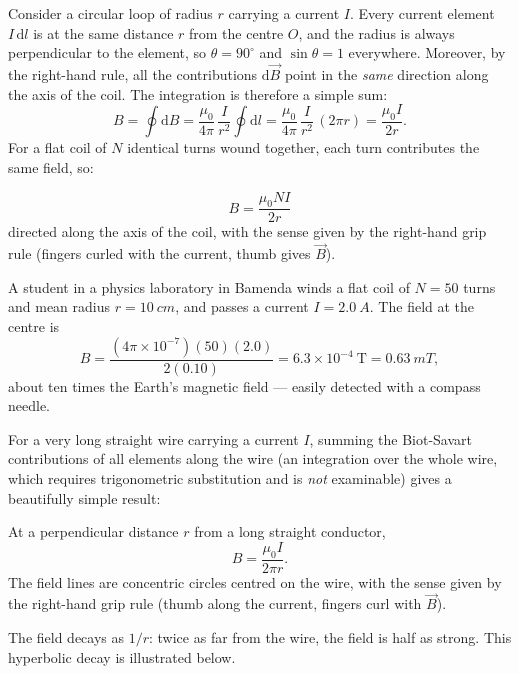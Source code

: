 \documentclass[11pt]{article}
\newcounter{popsec}
\newcounter{popsub}
\newcommand{\courssub}[1]{%
  \stepcounter{popsub}%
  \par\vspace{9pt}\noindent{\popxbold\fontsize{11.5}{13}\selectfont\color{popink}{\color{poporange}\thepopsec.\thepopsub}\hspace{6pt}#1}\par\nopagebreak\vspace{4pt}
}
\begin{document}
Consider a circular loop of radius $r$ carrying a current $I$. Every current element $I\,\mathrm{d}l$ is at the same distance $r$ from the centre $O$, and the radius is always perpendicular to the element, so $\theta = 90^{\circ}$ and $\sin\theta = 1$ everywhere. Moreover, by the right-hand rule, all the contributions $\mathrm{d}\vec{B}$ point in the \emph{same} direction along the axis of the coil. The integration is therefore a simple sum:
\[ B = \oint \mathrm{d}B = \frac{\mu_0}{4\pi}\,\frac{I}{r^{2}}\oint \mathrm{d}l = \frac{\mu_0}{4\pi}\,\frac{I}{r^{2}}\,(2\pi r) = \frac{\mu_0 I}{2r}. \]
For a flat coil of $N$ identical turns wound together, each turn contributes the same field, so:

\begin{propriete}
\[ B = \frac{\mu_0 N I}{2r} \]
directed along the axis of the coil, with the sense given by the right-hand grip rule (fingers curled with the current, thumb gives $\vec{B}$).
\end{propriete}

\begin{exemplebox}
A student in a physics laboratory in Bamenda winds a flat coil of $N = 50$ turns and mean radius $r = \SI{10}{cm}$, and passes a current $I = \SI{2.0}{A}$. The field at the centre is
\[ B = \frac{(4\pi\times 10^{-7})(50)(2.0)}{2(0.10)} = 6.3\times 10^{-4}\ \mathrm{T} = \SI{0.63}{mT}, \]
about ten times the Earth's magnetic field — easily detected with a compass needle.
\end{exemplebox}

\courssub{Field due to a Long Straight Wire}

For a very long straight wire carrying a current $I$, summing the Biot-Savart contributions of all elements along the wire (an integration over the whole wire, which requires trigonometric substitution and is \emph{not} examinable) gives a beautifully simple result:

\begin{propriete}
At a perpendicular distance $r$ from a long straight conductor,
\[ B = \frac{\mu_0 I}{2\pi r}. \]
The field lines are concentric circles centred on the wire, with the sense given by the right-hand grip rule (thumb along the current, fingers curl with $\vec{B}$).
\end{propriete}

The field decays as $1/r$: twice as far from the wire, the field is half as strong. This hyperbolic decay is illustrated below.
\end{document}
